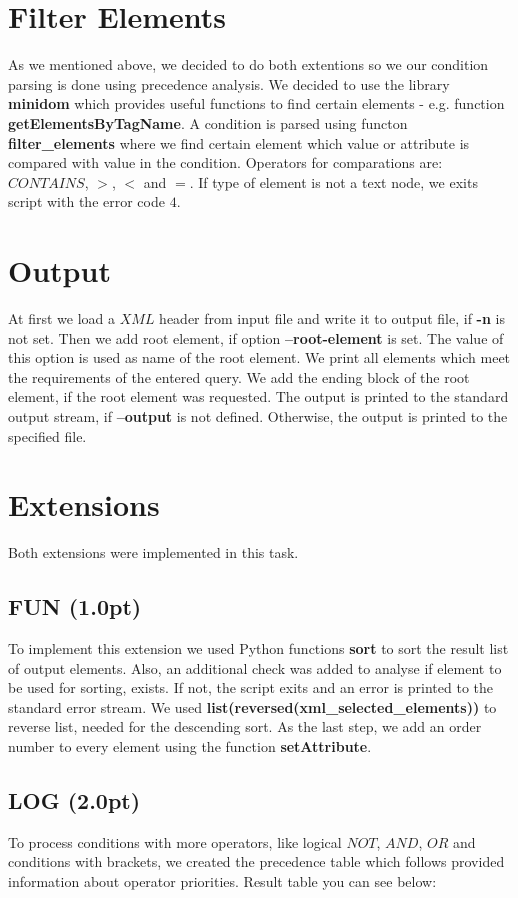 \documentclass[10pt,a4paper]{article}
\begin{document}
\section{Filter Elements}
	As we mentioned above, we decided to do both extentions so we our condition parsing is done using precedence analysis. We decided to use the library \textbf{minidom} which provides useful functions to find certain elements - e.g. function \textbf{getElementsByTagName}. A condition is parsed using functon \textbf{filter\_elements} where we find certain element which value or attribute is compared with value in the condition. Operators for comparations are: $CONTAINS$, $>$, $<$ and $=$. If type of element is not a text node, we exits script with the error code $4$.
	
\section{Output}
	At first we load a $XML$ header from input file and write it to output file, if \textbf{-n} is not set. Then we add root element, if option \textbf{--root-element} is set. The value of this option is used as name of the root element. We print all elements which meet the requirements of the entered query. We add the ending block of the root element, if the root element was requested. The output is printed to the standard output stream, if \textbf{--output} is not defined. Otherwise, the output is printed to the specified file.
	
	
\newpage
	
\section{Extensions}
	Both extensions were implemented in this task.

	\subsection{FUN (1.0pt)}
		To implement this extension we used Python functions \textbf{sort} to sort the result list of output elements. Also, an additional check was added to analyse if element to be used for sorting, exists. If not, the script exits and an error is printed to the standard error stream. We used \textbf{list(reversed(xml\_selected\_elements))} to reverse list, needed for the descending sort. As the last step, we add an order number to every element using the function \textbf{setAttribute}.
		
	\subsection{LOG (2.0pt)}
	        To process conditions with more operators, like logical $NOT$, $AND$, $OR$ and conditions with brackets, we created the precedence table which follows provided information about operator priorities. Result table you can see below:
	        
\end{document}
